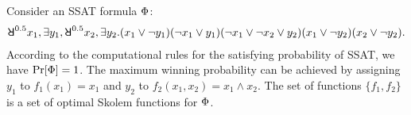 \begin{example}
    Consider an SSAT formula $\Phi$:
    \begin{align*}
        \random{0.5}x_1,\exists y_1,\random{0.5}x_2,\exists y_2.
        (x_1\lor\lnot y_1)(\lnot x_1\lor y_1)
        (\lnot x_1\lor\lnot x_2\lor y_2)(x_1\lor\lnot y_2)(x_2\lor\lnot y_2).
    \end{align*}
    According to the computational rules for the satisfying probability of SSAT, we have $\Pr[\Phi]=1$.
    The maximum winning probability can be achieved by assigning $y_1$ to $f_1(x_1)=x_1$ and $y_2$ to $f_2(x_1,x_2)=x_1\land x_2$.
    The set of functions $\{f_1,f_2\}$ is a set of optimal Skolem functions for $\Phi$.
\end{example}